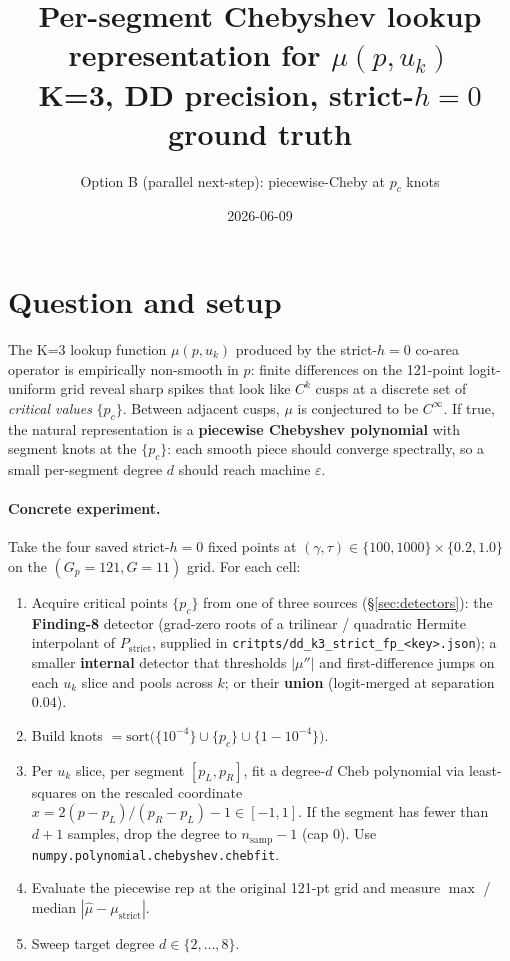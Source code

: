 \documentclass[11pt,a4paper]{article}
\title{Per-segment Chebyshev lookup representation for $\mu(p,u_k)$\\
\large K=3, DD precision, strict-$h{=}0$ ground truth}
\author{Option B (parallel next-step): piecewise-Cheby at $p_c$ knots}
\date{2026-06-09}
\begin{document}
\maketitle

\section{Question and setup}

The K=3 lookup function $\mu(p,u_k)$ produced by the strict-$h{=}0$ co-area
operator is empirically non-smooth in $p$: finite differences on the
121-point logit-uniform grid reveal sharp spikes that look like $C^k$ cusps
at a discrete set of \emph{critical values} $\{p_c\}$. Between adjacent
cusps, $\mu$ is conjectured to be $C^\infty$. If true, the natural
representation is a \textbf{piecewise Chebyshev polynomial} with segment
knots at the $\{p_c\}$: each smooth piece should converge spectrally, so a
small per-segment degree $d$ should reach machine $\varepsilon$.

\paragraph{Concrete experiment.}
Take the four saved strict-$h{=}0$ fixed points at
$(\gamma,\tau)\in\{100,1000\}\times\{0.2,1.0\}$ on the $(G_p{=}121,G{=}11)$
grid. For each cell:
\begin{enumerate}
\item Acquire critical points $\{p_c\}$ from one of three sources
  (\S\ref{sec:detectors}):
  the \textbf{Finding-8} detector (grad-zero roots of a trilinear / quadratic
  Hermite interpolant of $P_\mathrm{strict}$, supplied in
  \texttt{critpts/dd\_k3\_strict\_fp\_<key>.json}); a smaller \textbf{internal}
  detector that thresholds $|\mu''|$ and first-difference jumps on each
  $u_k$ slice and pools across $k$; or their \textbf{union} (logit-merged at
  separation $0.04$).
\item Build knots $= \mathrm{sort}\!\bigl(\{10^{-4}\}\cup\{p_c\}\cup\{1{-}10^{-4}\}\bigr)$.
\item Per $u_k$ slice, per segment $[p_L,p_R]$, fit a degree-$d$ Cheb
  polynomial via least-squares on the rescaled coordinate
  $x = 2(p-p_L)/(p_R-p_L)-1\in[-1,1]$. If the segment has fewer than
  $d{+}1$ samples, drop the degree to $n_\mathrm{samp}-1$ (cap 0). Use
  \texttt{numpy.polynomial.chebyshev.chebfit}.
\item Evaluate the piecewise rep at the original 121-pt grid and measure
  $\max$ / median $|\hat\mu-\mu_\mathrm{strict}|$.
\item Sweep target degree $d\in\{2,\ldots,8\}$.
\end{enumerate}
\end{document}
